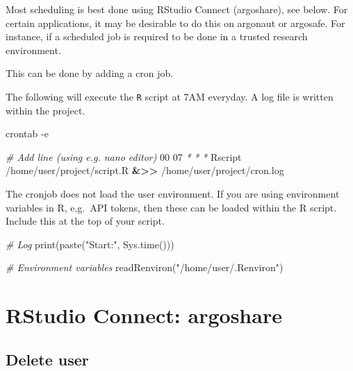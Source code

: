\documentclass[
]{book}
\newenvironment{Shaded}{\begin{snugshade}}{\end{snugshade}}
\newcommand{\AttributeTok}[1]{\textcolor[rgb]{0.77,0.63,0.00}{#1}}
\newcommand{\CommentTok}[1]{\textcolor[rgb]{0.56,0.35,0.01}{\textit{#1}}}
\newcommand{\ExtensionTok}[1]{#1}
\newcommand{\FunctionTok}[1]{\textcolor[rgb]{0.00,0.00,0.00}{#1}}
\newcommand{\NormalTok}[1]{#1}
\newcommand{\OperatorTok}[1]{\textcolor[rgb]{0.81,0.36,0.00}{\textbf{#1}}}
\newcommand{\PreprocessorTok}[1]{\textcolor[rgb]{0.56,0.35,0.01}{\textit{#1}}}
\newcommand{\StringTok}[1]{\textcolor[rgb]{0.31,0.60,0.02}{#1}}
\begin{document}
Most scheduling is best done using RStudio Connect (argoshare), see below.
For certain applications, it may be desirable to do this on argonaut or argosafe.
For instance, if a scheduled job is required to be done in a trusted research environment.

This can be done by adding a cron job.

The following will execute the \texttt{R} script at 7AM everyday. A log file is written within the project.

\begin{Shaded}
\begin{Highlighting}[]
\FunctionTok{crontab} \AttributeTok{{-}e}

\CommentTok{\# Add line (using e.g. nano editor)}
\ExtensionTok{00}\NormalTok{ 07 }\PreprocessorTok{*} \PreprocessorTok{*} \PreprocessorTok{*}\NormalTok{ Rscript /home/user/project/script.R }\OperatorTok{\&\textgreater{}\textgreater{}}\NormalTok{ /home/user/project/cron.log}
\end{Highlighting}
\end{Shaded}

The cronjob does not load the user environment.
If you are using environment variables in R, e.g.~API tokens, then these can be loaded within the R script.
Include this at the top of your script.

\begin{Shaded}
\begin{Highlighting}[]
\CommentTok{\# Log}
\FunctionTok{print}\NormalTok{(}\FunctionTok{paste}\NormalTok{(}\StringTok{"Start:"}\NormalTok{, }\FunctionTok{Sys.time}\NormalTok{()))}

\CommentTok{\# Environment variables}
\FunctionTok{readRenviron}\NormalTok{(}\StringTok{"/home/user/.Renviron"}\NormalTok{)}
\end{Highlighting}
\end{Shaded}

\hypertarget{rstudio-connect-argoshare}{%
\section{RStudio Connect: argoshare}\label{rstudio-connect-argoshare}}

\hypertarget{delete-user}{%
\subsection{Delete user}\label{delete-user}}
\end{document}
